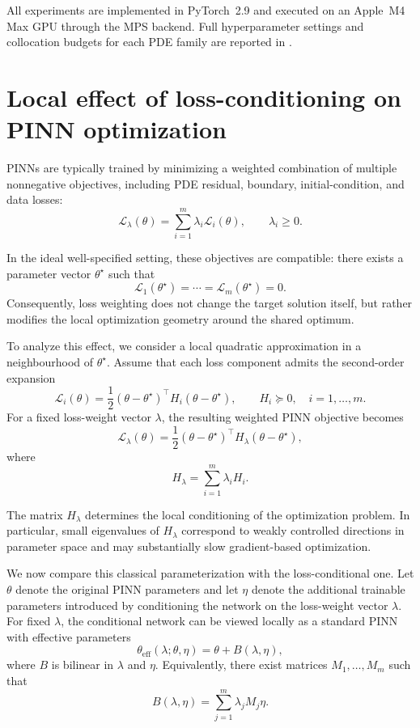 \documentclass{article}
\theoremstyle{plain}
\theoremstyle{definition}
\theoremstyle{remark}
\begin{document}
All experiments are implemented in PyTorch~2.9 and executed on an
Apple~M4 Max GPU through the MPS backend. Full hyperparameter settings
and collocation budgets for each PDE family are reported in
.


\section{Local effect of loss-conditioning on PINN optimization}
\label{sec:local_lc_pinn_theory}

PINNs are typically trained by minimizing a weighted combination of
multiple nonnegative objectives, including PDE residual, boundary,
initial-condition, and data losses:
\[
    \mathcal{L}_{\lambda}(\theta)
    =
    \sum_{i=1}^m
    \lambda_i \mathcal{L}_i(\theta),
    \qquad
    \lambda_i \geq 0 .
\]

In the ideal well-specified setting, these objectives are compatible:
there exists a parameter vector $\theta^\star$ such that
\[
    \mathcal{L}_1(\theta^\star)
    =
    \cdots
    =
    \mathcal{L}_m(\theta^\star)
    =
    0 .
\]
Consequently, loss weighting does not change the target solution
itself, but rather modifies the local optimization geometry around the
shared optimum.

To analyze this effect, we consider a local quadratic approximation in
a neighbourhood of $\theta^\star$. Assume that each loss component
admits the second-order expansion
\[
    \mathcal{L}_i(\theta)
    =
    \frac12
    (\theta-\theta^\star)^\top
    H_i
    (\theta-\theta^\star),
    \qquad
    H_i \succeq 0,
    \quad
    i=1,\dots,m .
\]
For a fixed loss-weight vector $\lambda$, the resulting weighted PINN
objective becomes
\[
    \mathcal{L}_{\lambda}(\theta)
    =
    \frac12
    (\theta-\theta^\star)^\top
    H_\lambda
    (\theta-\theta^\star),
\]
where
\[
    H_\lambda
    =
    \sum_{i=1}^m
    \lambda_i H_i .
\]

The matrix $H_\lambda$ determines the local conditioning of the
optimization problem. In particular, small eigenvalues of
$H_\lambda$ correspond to weakly controlled directions in parameter
space and may substantially slow gradient-based optimization.

We now compare this classical parameterization with the
loss-conditional one. Let $\theta$ denote the original PINN
parameters and let $\eta$ denote the additional trainable parameters
introduced by conditioning the network on the loss-weight vector
$\lambda$. For fixed $\lambda$, the conditional network can be viewed
locally as a standard PINN with effective parameters
\[
    \theta_{\mathrm{eff}}(\lambda;\theta,\eta)
    =
    \theta + B(\lambda,\eta),
\]
where $B$ is bilinear in $\lambda$ and $\eta$. Equivalently, there
exist matrices $M_1,\dots,M_m$ such that
\[
    B(\lambda,\eta)
    =
    \sum_{j=1}^m
    \lambda_j M_j \eta .
\]
\end{document}
